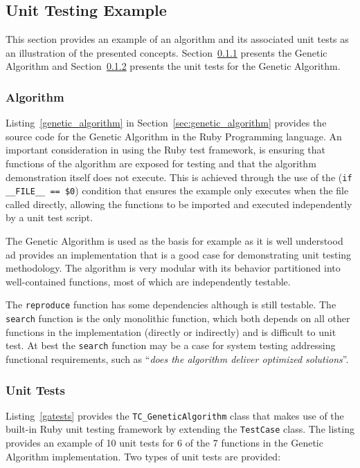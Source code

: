 %
%
\subsection{Unit Testing Example}
\label{sec:example}
This section provides an example of an algorithm and its associated unit tests as an illustration of the presented concepts. Section~\ref{subsec:algorithm} presents the Genetic Algorithm and Section~\ref{subsec:tests} presents the unit tests for the Genetic Algorithm.

\subsubsection{Algorithm}
\label{subsec:algorithm}
Listing~\ref{genetic_algorithm} in Section~\ref{sec:genetic_algorithm} provides the source code for the Genetic Algorithm in the Ruby Programming language. An important consideration in using the Ruby test framework, is ensuring that functions of the algorithm are exposed for testing and that the algorithm demonstration itself does not execute. This is achieved through the use of the (\texttt{if \_\_FILE\_\_ == \$0}) condition that ensures the example only executes when the file called directly, allowing the functions to be imported and executed independently by a unit test script.

The Genetic Algorithm is used as the basis for example as it is well understood ad provides an implementation that is a good case for demonstrating unit testing methodology. The algorithm is very modular with its behavior partitioned into well-contained functions, most of which are independently testable. 

The \texttt{reproduce} function has some dependencies although is still testable. The \texttt{search} function is the only monolithic function, which both depends on all other functions in the implementation (directly or indirectly) and is difficult to unit test. At best the \texttt{search} function may be a case for system testing addressing functional requirements, such as ``\emph{does the algorithm deliver optimized solutions}''.


\subsubsection{Unit Tests}
\label{subsec:tests}
Listing~\ref{gatests} provides the \texttt{TC\_GeneticAlgorithm} class that makes use of the built-in Ruby unit testing framework by extending the \texttt{TestCase} class.
The listing provides an example of 10 unit tests for 6 of the 7 functions in the Genetic Algorithm implementation. Two types of unit tests are provided: 


